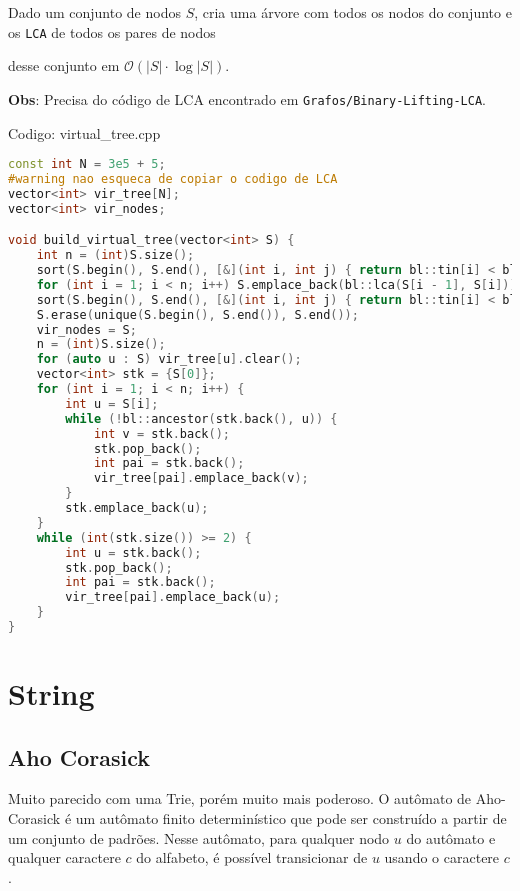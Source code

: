 \documentclass[10pt, a4paper, oneside]{book}
\begin{document}
Dado um conjunto de nodos $S$, cria uma árvore com todos os nodos do conjunto e os \texttt{LCA} de todos os pares de nodos

desse conjunto em $\mathcal{O}(|S| \cdot \log  |S|)$.



\textbf{Obs}: Precisa do código de LCA encontrado em \texttt{Grafos/Binary-Lifting-LCA}.

\hfill

Codigo: virtual\_tree.cpp

\begin{lstlisting}[language=C++]
const int N = 3e5 + 5;
#warning nao esqueca de copiar o codigo de LCA
vector<int> vir_tree[N];
vector<int> vir_nodes;

void build_virtual_tree(vector<int> S) {
    int n = (int)S.size();
    sort(S.begin(), S.end(), [&](int i, int j) { return bl::tin[i] < bl::tin[j]; });
    for (int i = 1; i < n; i++) S.emplace_back(bl::lca(S[i - 1], S[i]));
    sort(S.begin(), S.end(), [&](int i, int j) { return bl::tin[i] < bl::tin[j]; });
    S.erase(unique(S.begin(), S.end()), S.end());
    vir_nodes = S;
    n = (int)S.size();
    for (auto u : S) vir_tree[u].clear();
    vector<int> stk = {S[0]};
    for (int i = 1; i < n; i++) {
        int u = S[i];
        while (!bl::ancestor(stk.back(), u)) {
            int v = stk.back();
            stk.pop_back();
            int pai = stk.back();
            vir_tree[pai].emplace_back(v);
        }
        stk.emplace_back(u);
    }
    while (int(stk.size()) >= 2) {
        int u = stk.back();
        stk.pop_back();
        int pai = stk.back();
        vir_tree[pai].emplace_back(u);
    }
}
\end{lstlisting}
\hfill

\newpage

%
%
%
%

\chapter{String}

\section{Aho Corasick}


Muito parecido com uma Trie, porém muito mais poderoso. O autômato de Aho-Corasick é um autômato finito determinístico que pode ser construído a partir de um conjunto de padrões. Nesse autômato, para qualquer nodo $u$ do autômato e qualquer caractere $c$ do alfabeto, é possível transicionar de $u$ usando o caractere $c$.
\end{document}
